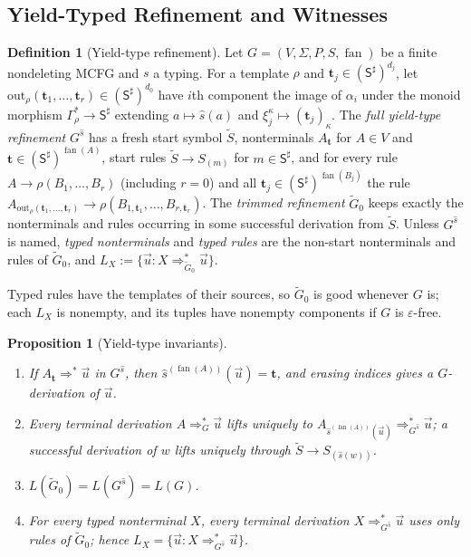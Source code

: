 \documentclass[11pt]{article}
\numberwithin{equation}{section}
\theoremstyle{plain}
\newtheorem{proposition}[theorem]{Proposition}
\theoremstyle{definition}
\newtheorem{definition}[theorem]{Definition}
\theoremstyle{remark}
\newcommand{\out}{\mathrm{out}}
\newcommand{\tuple}[1]{\vec{#1}}
\newcommand{\eps}{\varepsilon}
\newcommand{\fan}{\operatorname{fan}}
\theoremstyle{plain}
\begin{document}
\subsection{Yield-Typed Refinement and Witnesses}
\label{sec:refinement}

\begin{definition}[Yield-type refinement]
\label{def:output-refinement}
Let $G=(V,\Sigma,P,S,\fan)$ be a finite nondeleting MCFG and $s$ a typing.
For a template $\rho$ and $\mathbf t_j\in(\mathsf S^\sharp)^{d_j}$, let
$\out_\rho(\mathbf t_1,\ldots,\mathbf t_r)\in(\mathsf S^\sharp)^{d_0}$ have
$i$th component the image of $\alpha_i$ under the monoid morphism
$\Gamma_\rho^*\to\mathsf S^\sharp$ extending $a\mapsto\widehat{s}(a)$ and
$\xi_j^\kappa\mapsto(\mathbf t_j)_\kappa$.  The \emph{full yield-type
refinement} $G^{\widehat{s}}$ has a fresh start symbol $\widetilde S$,
nonterminals $A_{\mathbf t}$ for $A\in V$ and
$\mathbf t\in(\mathsf S^\sharp)^{\fan(A)}$, start rules
$\widetilde S\to S_{(m)}$ for $m\in\mathsf S^\sharp$, and for every rule
$A\to\rho(B_1,\ldots,B_r)$ (including $r=0$) and all
$\mathbf t_j\in(\mathsf S^\sharp)^{\fan(B_j)}$ the rule
$A_{\out_\rho(\mathbf t_1,\ldots,\mathbf t_r)}\to
\rho(B_{1,\mathbf t_1},\ldots,B_{r,\mathbf t_r})$.  The \emph{trimmed
refinement} $\widetilde G_0$ keeps exactly the nonterminals and rules occurring
in some successful derivation from $\widetilde S$.  Unless $G^{\widehat{s}}$ is
named, \emph{typed nonterminals} and \emph{typed rules} are the non-start
nonterminals and rules of $\widetilde G_0$, and
$L_X:=\{\tuple u:X\Rightarrow_{\widetilde G_0}^*\tuple u\}$.
\end{definition}

Typed rules have the templates of their sources, so $\widetilde G_0$ is good
whenever $G$ is; each $L_X$ is nonempty, and its tuples have nonempty
components if $G$ is $\eps$-free.

\begin{proposition}[Yield-type invariants]
\label{prop:output-invariants}
\begin{enumerate}[label=(\roman*),leftmargin=*]
\item If $A_{\mathbf t}\Rightarrow^*\tuple u$ in $G^{\widehat{s}}$, then
$\widehat{s}^{(\fan(A))}(\tuple u)=\mathbf t$, and erasing indices gives a
$G$-derivation of $\tuple u$.
\item Every terminal derivation $A\Rightarrow_G^*\tuple u$ lifts uniquely to
$A_{\widehat{s}^{(\fan(A))}(\tuple u)}\Rightarrow_{G^{\widehat{s}}}^*\tuple u$; a successful
derivation of $w$ lifts uniquely through $\widetilde S\to S_{(\widehat{s}(w))}$.
\item $L(\widetilde G_0)=L(G^{\widehat{s}})=L(G)$.
\item For every typed nonterminal $X$, every terminal derivation
$X\Rightarrow^*_{G^{\widehat s}}\tuple u$ uses only rules of $\widetilde G_0$; hence
$L_X=\{\tuple u:X\Rightarrow^*_{G^{\widehat s}}\tuple u\}$.
\end{enumerate}
\end{proposition}
\end{document}
